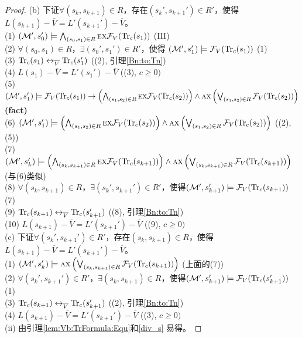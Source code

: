 \begin{proof}
	(b) 下证$\forall (s_k, s_{k+1}) \in R$，存在$(s_k', s_{k+1}') \in R'$，使得$L(s_{k+1}) - \overline V = L'(s_{k+1}') - \overline V$。\\
	(1) $({\cal M}', s_0') \models \bigwedge_{(s_0, s_1) \in R} \textsc{e} \textsc{x} {\cal F}_V(\textrm{Tr}_c(s_1))$  \hfill  (III)\\
	(2) $\forall (s_0, s_1) \in R$，$\exists (s_0', s_1') \in R'$，使得 $({\cal M}', s_1') \models {\cal F}_V(\textrm{Tr}_c(s_1))$  \hfill  (1)\\
	(3) $\textrm{Tr}_c(s_1) \leftrightarrow_{\overline V} \textrm{Tr}_c(s_1')$  \hfill  ((2), 引理\ref{Bn:to:Tn}) \\
	(4) $L(s_1) - \overline V = L'(s_1') - \overline V$  \hfill   ((3), $c \geq 0)$\\
	(5) $({\cal M}', s_1') \models {\cal F}_V(\textrm{Tr}_c(s_1)) \rightarrow \left(\bigwedge_{(s_1,s_2)\in R} \textsc{e} \textsc{x} {\cal F}_V(\textrm{Tr}_c(s_2))\right) \wedge \textsc{a} \textsc{x} \left(\bigvee_{(s_1,s_2)\in R} {\cal F}_V(\textrm{Tr}_c(s_2))\right)$     \hfill  \textbf{(fact)}\\
	(6) $({\cal M}', s_1') \models \left(\bigwedge_{(s_1,s_2)\in R} \textsc{e} \textsc{x} {\cal F}_V(\textrm{Tr}_c(s_2))\right) \wedge \textsc{a} \textsc{x} \left(\bigvee_{(s_1,s_2)\in R} {\cal F}_V(\textrm{Tr}_c(s_2))\right)$ \hfill ((2), (5))\\
	(7) $({\cal M}', s_k') \models \left(\bigwedge_{(s_k,s_{k+1})\in R} \textsc{e} \textsc{x} {\cal F}_V(\textrm{Tr}_c(s_{k+1}))\right) \wedge \textsc{a} \textsc{x} \left(\bigvee_{(s_k,s_{k+1})\in R} {\cal F}_V(\textrm{Tr}_c(s_{k+1}))\right)$       \hfill (与(6)类似)\\
	(8) $\forall (s_k, s_{k+1}) \in R$，$\exists (s_k', s_{k+1}') \in R'$，使得$({\cal M}', s_{k+1}') \models {\cal F}_V(\textrm{Tr}_c(s_{k+1}))$  \hfill  (7)\\
	(9) $\textrm{Tr}_c(s_{k+1}) \leftrightarrow_{\overline V} \textrm{Tr}_c(s_{k+1}')$    \hfill ((8), 引理\ref{Bn:to:Tn}) \\
	(10) $L(s_{k+1}) - \overline V = L'(s_{k+1}') - \overline V$  \hfill   ((9), $c \geq 0)$\\
	
	(c) 下证$\forall (s_k', s_{k+1}') \in R'$，存在$(s_k, s_{k+1})\in R$，使得$L(s_{k+1}) - \overline V = L'(s_{k+1}') - \overline V$。\\
	(1) $({\cal M}', s_k') \models \textsc{a} \textsc{x} \left(\bigvee_{(s_k,s_{k+1})\in R} {\cal F}_V(\textrm{Tr}_c(s_{k+1}))\right)$  \hfill (上面的(7))\\
	(2) $\forall (s_k', s_{k+1}') \in R'$，$\exists (s_k, s_{k+1}) \in R$，使得$({\cal M}', s_{k+1}') \models {\cal F}_V(\textrm{Tr}_c(s_{k+1}'))$  \hfill (1) \\
	(3) $\textrm{Tr}_c(s_{k+1}) \leftrightarrow_{\overline V} \textrm{Tr}_c(s_{k+1}')$    \hfill ((2), 引理\ref{Bn:to:Tn}) \\
	(4) $L(s_{k+1}) - \overline V = L'(s_{k+1}') - \overline V$  \hfill   ((3), $c \geq 0)$\\
	
	(ii) 由引理\ref{lem:Vb:TrFormula:Equ}和\ref{div_s} 易得。
	
\end{proof}



